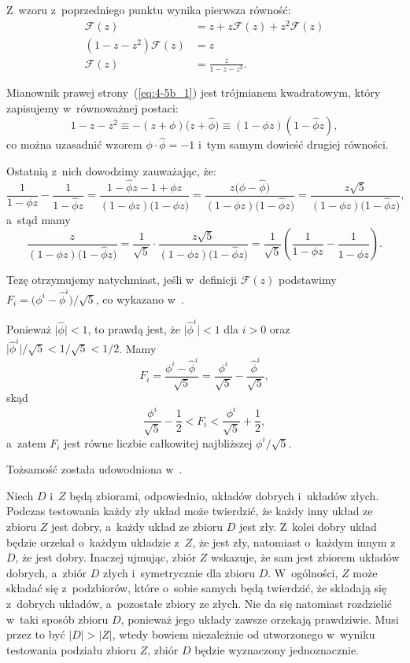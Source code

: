 \subproblem %
Z~wzoru z~poprzedniego punktu wynika pierwsza równość:
\begin{align*}
	\mathcal{F}(z) &= z+z\mathcal{F}(z)+z^2\mathcal{F}(z) \\
	(1-z-z^2)\mathcal{F}(z) &= z \\
	\mathcal{F}(z) &= \frac{z}{1-z-z^2}. \tag{$*$}\label{eq:4-5b_1}
\end{align*}

Mianownik prawej strony~(\ref{eq:4-5b_1}) jest trójmianem kwadratowym, który zapisujemy w~równoważnej postaci:
\[
	1-z-z^2 \equiv -(z+\phi)\bigl(z+\widehat\phi\bigr) \equiv (1-\phi z)(1-\widehat\phi z), \label{eq:4-5b_2}
\]
co można uzasadnić wzorem $\phi\cdot\widehat\phi=-1$ i~tym samym dowieść drugiej równości.

Ostatnią z~nich dowodzimy zauważając, że:
\[
	\frac{1}{1-\phi z}-\frac{1}{1-\widehat\phi z} = \frac{1-\widehat\phi z-1+\phi z}{(1-\phi z)\bigl(1-\widehat\phi z\bigr)} = \frac{z\bigl(\phi-\widehat\phi\bigr)}{(1-\phi z)\bigl(1-\widehat\phi z\bigr)} = \frac{z\sqrt{5}}{(1-\phi z)\bigl(1-\widehat\phi z\bigr)},
\]
a~stąd mamy
\[
	\frac{z}{(1-\phi z)\bigl(1-\widehat\phi z\bigr)} = \frac{1}{\sqrt{5}}\cdot\frac{z\sqrt{5}}{(1-\phi z)\bigl(1-\widehat\phi z\bigr)} = \frac{1}{\sqrt{5}}\left(\frac{1}{1-\phi z}-\frac{1}{1-\widehat\phi z}\right).
\]

\subproblem %
Tezę otrzymujemy natychmiast, jeśli w~definicji $\mathcal{F}(z)$ podstawimy $F_i=\bigl(\phi^i-\widehat\phi^i\bigr)/\sqrt{5}$, co wykazano w~.

\subproblem %
Ponieważ $\bigl|\widehat\phi\bigr|<1$, to prawdą jest, że $\bigl|\widehat\phi^i\bigr|<1$ dla $i>0$ oraz $\bigl|\widehat\phi^i\bigr|/\sqrt{5}<1/\sqrt{5}<1/2$. Mamy
\[
	F_i = \frac{\phi^i-\widehat\phi^i}{\sqrt{5}} = \frac{\phi^i}{\sqrt{5}}-\frac{\widehat\phi^i}{\sqrt{5}},
\]
skąd
\[
	\frac{\phi^i}{\sqrt{5}}-\frac{1}{2} < F_i < \frac{\phi^i}{\sqrt{5}}+\frac{1}{2},
\]
a~zatem $F_i$ jest równe liczbie całkowitej najbliższej $\phi^i/\sqrt{5}$.

\subproblem %
Tożsamość została udowodniona w~.


\subproblem %
Niech $D$ i~$Z$ będą zbiorami, odpowiednio, układów dobrych i~układów złych. Podczas testowania każdy zły układ może twierdzić, że każdy inny układ ze zbioru $Z$ jest dobry, a~każdy układ ze zbioru $D$ jest zły. Z~kolei dobry układ będzie orzekał o~każdym układzie z~$Z$, że jest zły, natomiast o~każdym innym z~$D$, że jest dobry. Inaczej ujmując, zbiór $Z$ wskazuje, że sam jest zbiorem układów dobrych, a~zbiór $D$ złych i~symetrycznie dla zbioru $D$. W~ogólności, $Z$ może składać się z~podzbiorów, które o~sobie samych będą twierdzić, że składają się z~dobrych układów, a~pozostałe zbiory ze złych. Nie da się natomiast rozdzielić w~taki sposób zbioru $D$, ponieważ jego układy zawsze orzekają prawdziwie. Musi przez to być $|D|>|Z|$, wtedy bowiem niezależnie od utworzonego w~wyniku testowania podziału zbioru $Z$, zbiór $D$ będzie wyznaczony jednoznacznie.

